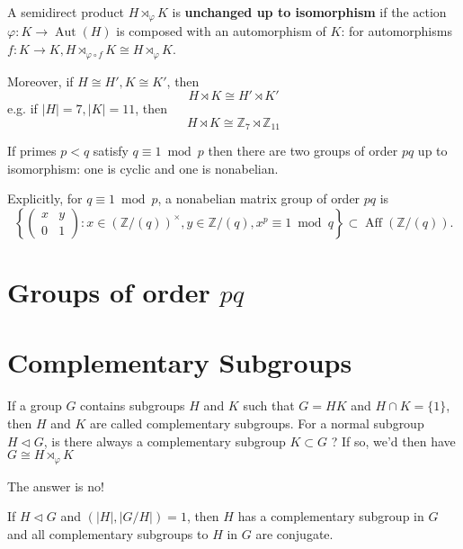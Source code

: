 \begin{lemma}[Lemma 6.2]
A semidirect product $H \rtimes_{\varphi} K$ is \textbf{unchanged up to isomorphism} if the action $\varphi: K \rightarrow \operatorname{Aut}(H)$ is composed with an automorphism of $K$: for automorphisms $f: K \rightarrow K, H \rtimes_{\varphi \circ f} K \cong H \rtimes_{\varphi} K$.
\end{lemma}
Moreover, if $H\cong H',K\cong K'$, then
\[
H\rtimes K\cong H'\rtimes K'
\]
e.g. if $\lvert H \rvert=7,\lvert K \rvert=11$, then
\[
H\rtimes K\cong \mathbb{Z}_{7}\rtimes \mathbb{Z}_{11}  
\]
\begin{theorem}[Theorem 6.3]
If primes $p<q$ satisfy $q \equiv 1 \bmod p$ then there are two groups of order $pq$ up to isomorphism: one is cyclic and one is nonabelian.
\end{theorem}
Explicitly, for $q \equiv 1 \bmod p$, a nonabelian matrix group of order $p q$ is
\[
\left\{\left(\begin{array}{ll}
x & y \\
0 & 1
\end{array}\right): x \in(\mathbb{Z} /(q))^{\times}, y \in \mathbb{Z} /(q), x^p \equiv 1 \bmod q\right\} \subset \operatorname{Aff}(\mathbb{Z} /(q)) .
\]
\section{Groups of order \texorpdfstring{$pq$}{pq}}

\section{Complementary Subgroups}

If a group $G$ contains subgroups $H$ and $K$ such that $G=H K$ and $H \cap K=\{1\}$, then $H$ and $K$ are called complementary subgroups. For a normal subgroup $H \triangleleft G$, is there always a complementary subgroup $K \subset G$ ? If so, we'd then have $G \cong H \rtimes_{\varphi} K$

The answer is no!

\begin{theorem}
If $H \lhd G$ and $(|H|,|G / H|)=1$, then $H$ has a complementary subgroup in $G$ and all complementary subgroups to $H$ in $G$ are conjugate.
\end{theorem}